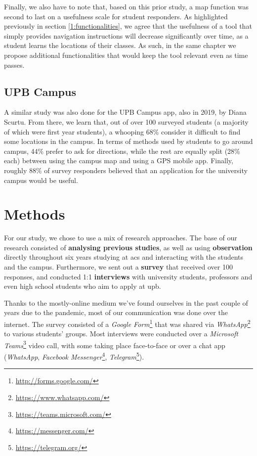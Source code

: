         Finally, we also have to note that, based on this prior study, a map function was second to last on a usefulness scale for student responders. As highlighted previously in section \ref{1:functionalities}, we agree that the usefulness of a tool that simply provides navigation instructions will decrease significantly over time, as a student learns the locations of their classes. As such, in the same chapter we propose additional functionalities that would keep the tool relevant even as time passes.
    
    \subsection{UPB Campus}
    
        A similar study was also done for the UPB Campus app, also in 2019, by Diana Scurtu\cite{scurtu2020upb}. From there, we learn that, out of over 100 surveyed students (a majority of which were first year students), a whooping 68\% consider it difficult to find some locations in the campus. In terms of methods used by students to go around campus, 44\% prefer to ask for directions, while the rest are equally split (28\% each) between using the campus map and using a GPS mobile app. Finally, roughly 88\% of survey responders believed that an application for the university campus would be useful.

\section{Methods}

    For our study, we chose to use a mix of research approaches. The base of our research consisted of \textbf{analysing previous studies}, as well as using \textbf{observation} directly throughout six years studying at \acrshort{acs} and interacting with the students and the campus. Furthermore, we sent out a \textbf{survey} that received over 100 responses, and conducted 1:1 \textbf{interviews} with university students, professors and even high school students who aim to apply at \acrshort{upb}.
    
    Thanks to the mostly-online medium we've found ourselves in the past couple of years due to the pandemic, most of our communication was done over the internet. The survey consisted of a \textit{Google Form}\footnote{\url{http://forms.google.com/}} that was shared via \textit{WhatsApp}\footnote{\url{https://www.whatsapp.com/}} to various students' groups. Most interviews were conducted over a \textit{Microsoft Teams}\footnote{\url{https://teams.microsoft.com/}} video call, with some taking place face-to-face or over a chat app (\textit{WhatsApp}, \textit{Facebook Messenger}\footnote{\url{https://messenger.com/}}, \textit{Telegram}\footnote{\url{https://telegram.org/}}).
    
